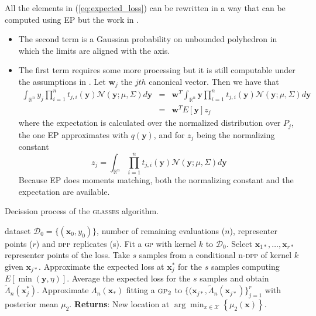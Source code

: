 \documentclass{article} %
\newcommand{\bx}{\textbf{x}}
\newcommand{\bw}{\textbf{w}}
\newcommand{\by}{\textbf{y}}
\newcommand{\N}{\mathcal{N}}
\newcommand{\IR}{\mathbb{R}}
\newcommand{\acr}[1]{\textsc{#1}\xspace}
\newcommand{\gp}{\acr{gp}}
\newcommand{\dpp}{\acr{dpp}}
\newcommand{\us}{\acr{glasses}}
\begin{document}
All the elements in (\ref{eq:expected_loss}) can be rewritten in a way that can be computed using EP but the work in \cite{Cunningham*Hennig*Lacoste-Julien_2011}. 

\begin{itemize}
\item The second term is a Gaussian probability on unbounded polyhedron in which the limits are aligned with the axis.  
\item The first term requires some more processing but it is still computable under the assumptions in \cite{Cunningham*Hennig*Lacoste-Julien_2011}. Let $\bw_j$ the $jth$ canonical vector. Then we have that
\begin{eqnarray}
\int_{\IR^n} y_j \prod_{i=1}^n t_{j,i}(\by) \N(\by; \mu, \Sigma) d \by & = & \bw^T  \int_{\IR^n} \by \prod_{i=1}^n t_{j,i}(\by) \N(\by; \mu, \Sigma) d \by \\
& = & \bw^T E[\by] z_j
\end{eqnarray}
where the expectation is calculated over the normalized distribution over $P_j$, the one EP approximates with $q(\by)$, and for $z_j$ being the normalizing constant 
  $$z_j= \int_{\IR^n} \prod_{i=1}^n t_{j,i}(\by) \N(\by; \mu, \Sigma) d \by$$  
Because EP does moments matching, both the normalizing constant and the expectation are available.
\end{itemize}



\begin{algorithm}[t!]
   \caption{Decission process of the \us algorithm.}
   \label{alg:glasses}
\begin{algorithmic}
    dataset $\mathcal{D}_{0} = \{(\textbf{x}_0, y_0)\}$, number of remaining evaluations ($n$), representer points ($r$) and \dpp replicates (s).
\STATE
   \STATE Fit a \gp with kernel $k$ to $\mathcal{D}_{0}$.
   \STATE Select $\bx_{1*},\dots,\bx_{r*}$ representer points of the loss.
   \STATE Take $s$ samples from a conditional n-\dpp of kernel $k$ given $\bx_{j*}$.
   \STATE Approximate the expected loss at $\bx_j^*$ for the $s$ samples computing $E [\min (\by,\eta)]$.
  \STATE Average the expected loss for the $s$ samples and obtain $\tilde{\Lambda}_n(\bx_j^*)$.
   \ENDFOR
\STATE Approximate $\Lambda_n(\bx_*)$ fitting a $\gp_2$  to $\{(\bx_{j*}, \tilde{\Lambda}_n(\bx_{j*})\}_{j=1}^r$ with posterior mean $\mu_2$.
   \STATE \textbf{Returns}: New location at $\arg \min_{x \in \mathcal{X}} \left\{\mu_2(\bx)\right\}$.  
\end{algorithmic}
\end{algorithm}





\end{document}

